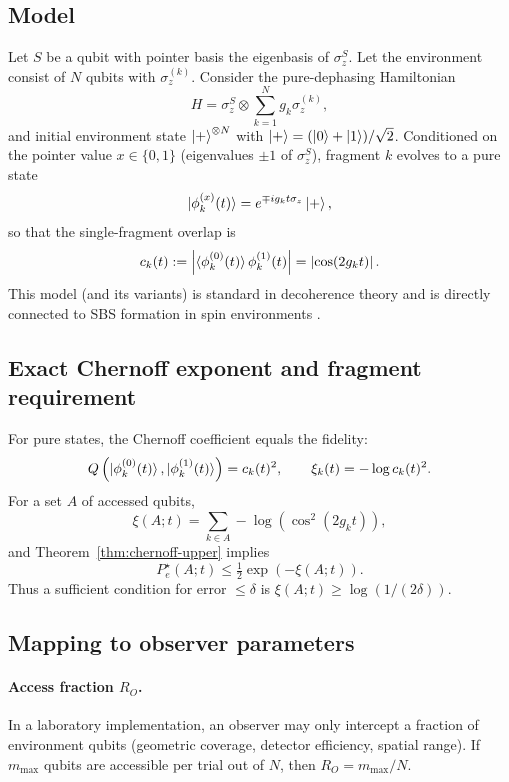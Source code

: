 \documentclass[11pt]{article}
\newcommand{\1}{\mathbf{1}}
\newcommand{\QCBcoef}{Q}
\newcommand{\QCBdist}{\xi}
\theoremstyle{definition}
\theoremstyle{plain}
\begin{document}
\subsection{Model}

Let $S$ be a qubit with pointer basis the eigenbasis of $\sigma_z^S$.
Let the environment consist of $N$ qubits with $\sigma_z^{(k)}$.
Consider the pure-dephasing Hamiltonian
\begin{equation}
H = \sigma_z^S \otimes \sum_{k=1}^N g_k \sigma_z^{(k)},
\label{eq:centralspin-H}
\end{equation}
and initial environment state $\ket{+}^{\otimes N}$ with $\ket{+}=(\ket{0}+\ket{1})/\sqrt{2}$.
Conditioned on the pointer value $x\in\{0,1\}$ (eigenvalues $\pm1$ of $\sigma_z^S$), fragment $k$ evolves to a pure state
\[
\ket{\phi_k^{(x)}(t)} = e^{\mp i g_k t \sigma_z}\ket{+},
\]
so that the single-fragment overlap is
\begin{equation}
c_k(t):=\left|\braket{\phi_k^{(0)}(t)}{\phi_k^{(1)}(t)}\right|=\left|\cos(2 g_k t)\right|.
\label{eq:ck}
\end{equation}
This model (and its variants) is standard in decoherence theory and is directly connected to SBS formation in spin environments \citep{KorbiczReview2021,RoszakKorbicz2019}.

\subsection{Exact Chernoff exponent and fragment requirement}

For pure states, the Chernoff coefficient equals the fidelity:
\[
\QCBcoef\left(\ket{\phi_k^{(0)}(t)},\ket{\phi_k^{(1)}(t)}\right)=c_k(t)^2,
\qquad
\QCBdist_k(t)=-\log c_k(t)^2.
\]
For a set $A$ of accessed qubits,
\begin{equation}
\QCBdist(A;t)=\sum_{k\in A} -\log\left(\cos^2(2 g_k t)\right),
\label{eq:xi-centralspin}
\end{equation}
and Theorem~\ref{thm:chernoff-upper} implies
\[
P_e^\star(A;t)\le \tfrac12 \exp\!\left(-\QCBdist(A;t)\right).
\]
Thus a sufficient condition for error $\le\delta$ is $\QCBdist(A;t)\ge \log(1/(2\delta))$.

\subsection{Mapping to observer parameters}

\paragraph{Access fraction $R_O$.}
In a laboratory implementation, an observer may only intercept a fraction of environment qubits (geometric coverage, detector efficiency, spatial range).
If $m_{\max}$ qubits are accessible per trial out of $N$, then $R_O=m_{\max}/N$.
\end{document}
